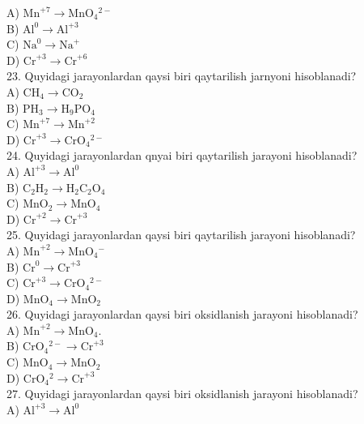 A) $\mathrm{Mn}^{+7} \rightarrow \mathrm{MnO}_{4}{ }^{2-}$\\
B) $\mathrm{Al}^{0} \rightarrow \mathrm{Al}^{+3}$\\
C) $\mathrm{Na}^{0} \rightarrow \mathrm{Na}^{+}$\\
D) $\mathrm{Cr}^{+3} \rightarrow \mathrm{Cr}^{+6}$\\
23. Quyidagi jarayonlardan qaysi biri qaytarilish jarnyoni hisoblanadi?\\
A) $\mathrm{CH}_{4} \rightarrow \mathrm{CO}_{2}$\\
B) $\mathrm{PH}_{3} \rightarrow \mathrm{H}_{9} \mathrm{PO}_{4}$\\
C) $\mathrm{Mn}^{+7} \rightarrow \mathrm{Mn}^{+2}$\\
D) $\mathrm{Cr}^{+3} \rightarrow \mathrm{CrO}_{4}{ }^{2-}$\\
24. Quyidagi jarayonlardan qnyai biri qaytarilish jarayoni hisoblanadi?\\
A) $\mathrm{Al}^{+3} \rightarrow \mathrm{Al}^{0}$\\
B) $\mathrm{C}_{2} \mathrm{H}_{2} \rightarrow \mathrm{H}_{2} \mathrm{C}_{2} \mathrm{O}_{4}$\\
C) $\mathrm{MnO}_{2} \rightarrow \mathrm{MnO}_{4}$\\
D) $\mathrm{Cr}^{+2} \rightarrow \mathrm{Cr}^{+3}$\\
25. Quyidagi jarayonlardan qaysi biri qaytarilish jarayoni hisoblanadi?\\
A) $\mathrm{Mn}^{+2} \rightarrow \mathrm{MnO}_{4}{ }^{-}$\\
B) $\mathrm{Cr}^{0} \rightarrow \mathrm{Cr}^{+3}$\\
C) $\mathrm{Cr}^{+3} \rightarrow \mathrm{CrO}_{4}{ }^{2-}$\\
D) $\mathrm{MnO}_{4} \rightarrow \mathrm{MnO}_{2}$\\
26. Quyidagi jarayonlardan qaysi biri oksidlanish jarayoni hisoblanadi?\\
A) $\mathrm{Mn}^{+2} \rightarrow \mathrm{MnO}_{4}$.\\
B) $\mathrm{CrO}_{4}{ }^{2-} \rightarrow \mathrm{Cr}^{+3}$\\
C) $\mathrm{MnO}_{4} \rightarrow \mathrm{MnO}_{2}$\\
D) $\mathrm{CrO}_{4}{ }^{2} \rightarrow \mathrm{Cr}^{+3}$\\
27. Quyidagi jarayonlardan qaysi biri oksidlanish jarayoni hisoblanadi?\\
A) $\mathrm{Al}^{+3} \rightarrow \mathrm{Al}^{0}$\\
